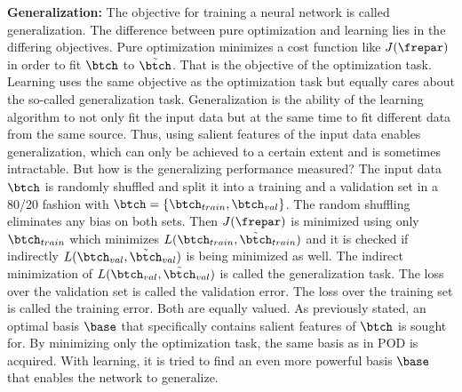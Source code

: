 \textbf{Generalization:}
The objective for training a neural network is called generalization. The difference between pure optimization and learning lies in the differing objectives. Pure optimization minimizes a cost function like \(J(\frepar)\)  in order to fit \(\btch\) to \(\tilde{\btch}\). That is the objective of the optimization task. Learning uses the same objective as the optimization task but equally cares about the so-called generalization task. Generalization is the ability of the learning algorithm to not only fit the input data but at the same time to fit different data from the same source. Thus, using salient features of the input data enables generalization, which can only be achieved to a certain extent and is sometimes intractable. But how is the generalizing performance measured? The input data \(\btch\) is randomly shuffled and split it into a training and a validation set in a 80/20 fashion with \(\btch=\{\btch_{train},\btch_{val}\}\). The random shuffling eliminates any bias on both sets. Then \(J(\frepar)\) is minimized using only \(\btch_{train}\) which minimizes \(L(\btch_{train},\tilde{\btch}_{train})\) and it is checked if indirectly \(L(\btch_{val},\tilde{\btch}_{val})\) is being minimized as well. The indirect minimization of \(L(\btch_{val},\tilde{\btch}_{val})\) is called the generalization task. The loss over the validation set is called the validation error.  The loss over the training set is called the training error.  Both are equally valued. As previously stated, an optimal basis \(\base\) that specifically contains salient features of \(\btch\) is sought for. By minimizing only the optimization task, the same basis as in POD is acquired. With learning, it is tried to find an even more powerful basis \(\base\) that enables the network to generalize.\\

